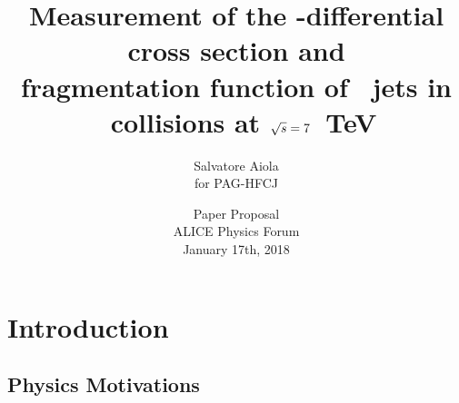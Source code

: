 \documentclass[xcolor={usenames,dvipsnames}, aspectratio=169]{beamer}
\title[D-Tagged Jets in \pp] %
{Measurement of the \pt-differential cross section and \\ fragmentation function of \Dzero\ jets in \pp\ collisions at $\sqrt{s}=7$~TeV}
\author[Salvatore Aiola]%
{Salvatore Aiola \\
for PAG-HFCJ}
\institute[Yale University] %
{Yale University}
\date[Jan. 17th, 2018] %
{Paper Proposal\\
ALICE Physics Forum\\
January 17th, 2018}
\begin{document}
\begin{frame}
  \titlepage
\end{frame}








\section{Introduction}

\subsection{Physics Motivations}
\end{document}
